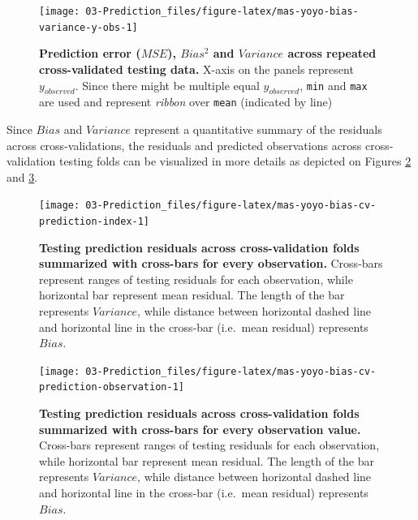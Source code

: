 \documentclass[
]{book}
\begin{document}
\begin{figure}

{\centering \texttt{[image: 03-Prediction\_files/figure-latex/mas-yoyo-bias-variance-y-obs-1]} 

}

\caption{\textbf{Prediction error (\(MSE\)), \(Bias^2\) and \(Variance\) across repeated cross-validated testing data. }X-axis on the panels represent \(y_{observed}\). Since there might be multiple equal \(y_{observed}\), \texttt{min} and \texttt{max} are used and represent \emph{ribbon} over \texttt{mean} (indicated by line)}\label{fig:mas-yoyo-bias-variance-y-obs}
\end{figure}



Since \(Bias\) and \(Variance\) represent a quantitative summary of the residuals across cross-validations, the residuals and predicted observations across cross-validation testing folds can be visualized in more details as depicted on Figures \ref{fig:mas-yoyo-bias-cv-prediction-index} and \ref{fig:mas-yoyo-bias-cv-prediction-observation}.

\begin{figure}

{\centering \texttt{[image: 03-Prediction\_files/figure-latex/mas-yoyo-bias-cv-prediction-index-1]} 

}

\caption{\textbf{Testing prediction residuals across cross-validation folds summarized with cross-bars for every observation.} Cross-bars represent ranges of testing residuals for each observation, while horizontal bar represent mean residual. The length of the bar represents \(Variance\), while distance between horizontal dashed line and horizontal line in the cross-bar (i.e.~mean residual) represents \(Bias\).}\label{fig:mas-yoyo-bias-cv-prediction-index}
\end{figure}



\begin{figure}

{\centering \texttt{[image: 03-Prediction\_files/figure-latex/mas-yoyo-bias-cv-prediction-observation-1]} 

}

\caption{\textbf{Testing prediction residuals across cross-validation folds summarized with cross-bars for every observation value.} Cross-bars represent ranges of testing residuals for each observation, while horizontal bar represent mean residual. The length of the bar represents \(Variance\), while distance between horizontal dashed line and horizontal line in the cross-bar (i.e.~mean residual) represents \(Bias\).}\label{fig:mas-yoyo-bias-cv-prediction-observation}
\end{figure}
\end{document}
